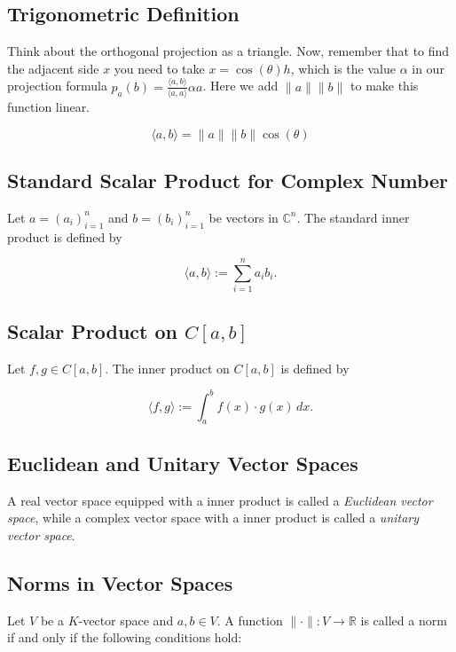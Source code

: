 \subsection{Trigonometric Definition}

Think about the orthogonal projection as a triangle. Now, remember that to find the adjacent side \(x\) 
you need to take \(x = \cos(\theta)h\), which is the value \(\alpha\) in our projection formula 
\(p_a (b) = \frac{\langle a, b\rangle}{\langle a, a\rangle} \alpha a\). 
Here we add \(\|a\|\|b\|\) to make this function linear.

\[
\langle a, b \rangle = \|a\| \|b\| \cos (\theta)
\]

\subsection{Standard Scalar Product for Complex Number}

Let \( a = {(a_i)}_{i=1}^n \) and \( b = {(b_i)}_{i=1}^n \) be vectors in \( \mathbb{C}^n \). The standard inner product is defined by

\[
\langle a, b \rangle := \sum_{i=1}^n a_i b_i.
\]

\subsection{Scalar Product on \texorpdfstring{\( C[a, b] \)}{}}

Let \( f, g \in C[a, b] \). The inner product on \( C[a, b] \) is defined by

\[
\langle f, g \rangle := \int_a^b f(x) \cdot g(x) \, dx.
\]

\subsection{Euclidean and Unitary Vector Spaces}

A real vector space equipped with a inner product is called a \textit{Euclidean vector space}, while a complex vector space with a inner product is called a \textit{unitary vector space}.

\subsection{Norms in Vector Spaces}

Let \( V \) be a \( K \)-vector space and \( a, b \in V \). A function \( \| \cdot \| : V \to \mathbb{R} \) is called a norm if and only if the following conditions hold:

